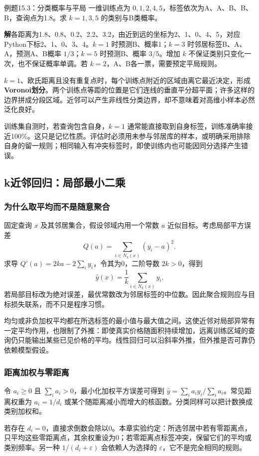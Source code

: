 \documentclass[UTF8,fontset=none,zihao=-4,a4paper]{ctexart}
\newcommand{\term}[1]{\textbf{#1}}
\newcommand{\sol}{\par\noindent\textbf{解}\quad}
\numberwithin{equation}{section}
\numberwithin{figure}{section}
\begin{document}
\begin{infobox}[unbreakable]{例题15.3：分类概率与平局}
一维训练点为 $0,1,2,4,5$，标签依次为A、A、B、B、B，查询点为1.8。求 $k=1,3,5$ 的类别与B类概率。
\sol 各距离为1.8、0.8、0.2、2.2、3.2，由近到远的坐标为2、1、0、4、5，对应Python下标2、1、0、3、4。$k=1$ 时预测B、概率1；$k=3$ 时邻居标签B、A、A，预测A、B概率 $1/3$；$k=5$ 时预测B、概率 $3/5$。增加 $k$ 不保证类别只变化一次，也不保证概率单调。若 $k=2$，A、B各一票，需要预定平局规则。
\end{infobox}
$k=1$、欧氏距离且没有重复点时，每个训练点附近的区域由离它最近决定，形成\term{Voronoi划分}。两个训练点等距的位置是它们连线的垂直平分超平面；许多这样的边界拼成分段区域。近邻可以产生非线性分类边界，却不意味着对高维小样本必然泛化良好。

训练集自测时，若查询包含自身，$k=1$ 通常能直接取到自身标签，训练准确率接近100\%。这只是记忆性质。评估时必须用未参与邻居库的样本，或明确采用排除自身的留一规则；相同输入有冲突标签时，即使训练内也可能因同分选择产生错误。

\subsection{k近邻回归：局部最小二乘}
\subsubsection{为什么取平均而不是随意聚合}
固定查询 $x$ 及其邻居集合，假设邻域内用一个常数 $a$ 近似目标。考虑局部平方误差
\[
 Q(a)=\sum_{i\in N_k(x)}(y_i-a)^2.
\]
求导 $Q'(a)=2ka-2\sum_i y_i$，令其为0，二阶导数 $2k>0$，得到
\[
 \widehat y(x)=\frac1k\sum_{i\in N_k(x)}y_i.
\]
若局部目标改为绝对误差，最优常数改为邻居标签的中位数。因此聚合规则应与目标损失联系，而不只是程序习惯。

均匀或非负加权平均都在所选标签的最小值与最大值之间。这使近邻对局部异常有一定平均作用，也限制了外推：即使真实价格随面积持续增加，远离训练区域的查询仍只能输出某些已见价格的平均。线性回归可以沿斜率外推，但外推是否可靠仍依赖模型假设。

\subsubsection{距离加权与零距离}
令 $a_i\ge0$ 且 $\sum_i a_i>0$，最小化加权平方误差可得到 $\widehat y=\sum_i a_i y_i/\sum_i a_i$。常见距离权重为 $a_i=1/d_i$ 或某个随距离减小而增大的核函数。分类同样可以把计数换成类别加权和。

若存在 $d_i=0$，直接求倒数会除以0。本章实验约定：所选邻居中若有零距离点，只平均这些零距离点，其余权重设为0；若零距离点标签冲突，保留它们的平均或类别频率。另一种 $1/(d_i+\varepsilon)$ 会依赖人为选择的 $\varepsilon$，它不是完全相同的规则。
\end{document}
